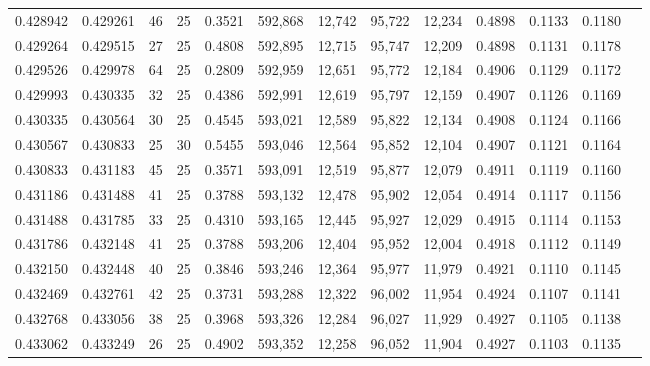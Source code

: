 \begin{tabular}{rrrrrrrrrrrrr}
0.428942 & 0.429261 &    46 &  25 &                                     0.3521 & 592,868 &  12,742 &  95,722 &  12,234 & 0.4898 & 0.1133 & 0.1180 \\
0.429264 & 0.429515 &    27 &  25 &                                     0.4808 & 592,895 &  12,715 &  95,747 &  12,209 & 0.4898 & 0.1131 & 0.1178 \\
0.429526 & 0.429978 &    64 &  25 &                                     0.2809 & 592,959 &  12,651 &  95,772 &  12,184 & 0.4906 & 0.1129 & 0.1172 \\
0.429993 & 0.430335 &    32 &  25 &                                     0.4386 & 592,991 &  12,619 &  95,797 &  12,159 & 0.4907 & 0.1126 & 0.1169 \\
0.430335 & 0.430564 &    30 &  25 &                                     0.4545 & 593,021 &  12,589 &  95,822 &  12,134 & 0.4908 & 0.1124 & 0.1166 \\
0.430567 & 0.430833 &    25 &  30 &                                     0.5455 & 593,046 &  12,564 &  95,852 &  12,104 & 0.4907 & 0.1121 & 0.1164 \\
0.430833 & 0.431183 &    45 &  25 &                                     0.3571 & 593,091 &  12,519 &  95,877 &  12,079 & 0.4911 & 0.1119 & 0.1160 \\
0.431186 & 0.431488 &    41 &  25 &                                     0.3788 & 593,132 &  12,478 &  95,902 &  12,054 & 0.4914 & 0.1117 & 0.1156 \\
0.431488 & 0.431785 &    33 &  25 &                                     0.4310 & 593,165 &  12,445 &  95,927 &  12,029 & 0.4915 & 0.1114 & 0.1153 \\
0.431786 & 0.432148 &    41 &  25 &                                     0.3788 & 593,206 &  12,404 &  95,952 &  12,004 & 0.4918 & 0.1112 & 0.1149 \\
0.432150 & 0.432448 &    40 &  25 &                                     0.3846 & 593,246 &  12,364 &  95,977 &  11,979 & 0.4921 & 0.1110 & 0.1145 \\
0.432469 & 0.432761 &    42 &  25 &                                     0.3731 & 593,288 &  12,322 &  96,002 &  11,954 & 0.4924 & 0.1107 & 0.1141 \\
0.432768 & 0.433056 &    38 &  25 &                                     0.3968 & 593,326 &  12,284 &  96,027 &  11,929 & 0.4927 & 0.1105 & 0.1138 \\
0.433062 & 0.433249 &    26 &  25 &                                     0.4902 & 593,352 &  12,258 &  96,052 &  11,904 & 0.4927 & 0.1103 & 0.1135 \\

\end{tabular}
